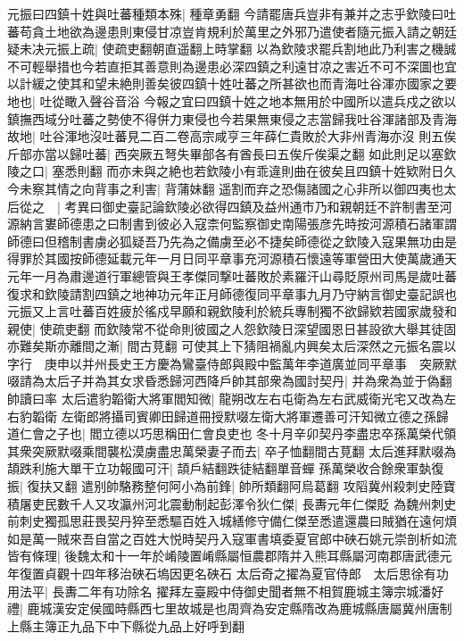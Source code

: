元振曰四鎮十姓與吐蕃種類本殊|{
	種章勇翻}
今請罷唐兵豈非有兼并之志乎欽陵曰吐蕃苟貪土地欲為邊患則東侵甘凉豈肯規利於萬里之外邪乃遣使者隨元振入請之朝廷疑未决元振上疏|{
	使疏吏翻朝直遥翻上時掌翻}
以為欽陵求罷兵割地此乃利害之機誠不可輕舉措也今若直拒其善意則為邊患必深四鎮之利遠甘凉之害近不可不深圖也宜以計緩之使其和望未絶則善矣彼四鎮十姓吐蕃之所甚欲也而青海吐谷渾亦國家之要地也|{
	吐從瞰入聲谷音浴}
今報之宜曰四鎮十姓之地本無用於中國所以遣兵戍之欲以鎮撫西域分吐蕃之勢使不得併力東侵也今若果無東侵之志當歸我吐谷渾諸部及青海故地|{
	吐谷渾地沒吐蕃見二百二卷高宗咸亨三年薛仁貴敗於大非州青海亦沒}
則五俟斤部亦當以歸吐蕃|{
	西突厥五弩失畢部各有酋長曰五俟斤俟渠之翻}
如此則足以塞欽陵之口|{
	塞悉則翻}
而亦未與之絶也若欽陵小有乖違則曲在彼矣且四鎮十姓欵附日久今未察其情之向背事之利害|{
	背蒲妹翻}
遥割而弃之恐傷諸國之心非所以御四夷也太后從之　|{
	考異曰御史臺記論欽陵必欲得四鎮及益州通市乃和親朝廷不許制書至河源納言婁師德患之曰制書到彼必入寇柰何監察御史南陽張彦先時按河源積石諸軍謂師德曰但稽制書虜必狐疑吾乃先為之備虜至必不捷矣師德從之欽陵入寇果無功由是得罪於其國按師德延載元年一月日同平章事充河源積石懷遠等軍營田大使萬歲通天元年一月為肅邊道行軍總管與王孝傑同撃吐蕃敗於素羅汗山尋貶原州司馬是歲吐蕃復求和欽陵請割四鎮之地神功元年正月師德復同平章事九月乃守納言御史臺記誤也}
元振又上言吐蕃百姓疲於徭戍早願和親欽陵利於統兵專制獨不欲歸欵若國家歲發和親使|{
	使疏吏翻}
而欽陵常不從命則彼國之人怨欽陵日深望國恩日甚設欲大舉其徒固亦難矣斯亦離間之漸|{
	間古莧翻}
可使其上下猜阻禍亂内興矣太后深然之元振名震以字行　庚申以并州長史王方慶為鸞臺侍郎與殿中監萬年李道廣並同平章事　突厥默啜請為太后子并為其女求昏悉歸河西降戶帥其部衆為國討契丹|{
	并為衆為並于偽翻帥讀曰率}
太后遣豹韜衛大將軍閻知微|{
	龍朔改左右屯衛為左右武威衛光宅又改為左右豹韜衛}
左衛郎將攝司賓卿田歸道冊授默啜左衛大將軍遷善可汗知微立德之孫歸道仁會之子也|{
	閻立德以巧思稱田仁會良吏也}
冬十月辛卯契丹李盡忠卒孫萬榮代領其衆突厥默啜乘間襲松漠虜盡忠萬榮妻子而去|{
	卒子恤翻間古莧翻}
太后進拜默啜為頡跌利施大單干立功報國可汗|{
	頡戶結翻跌徒結翻單音蟬}
孫萬榮收合餘衆軍埶復振|{
	復扶又翻}
遣别帥駱務整何阿小為前鋒|{
	帥所類翻阿烏葛翻}
攻䧟冀州殺刺史陸寶積屠吏民數千人又攻瀛州河北震動制起彭澤令狄仁傑|{
	長夀元年仁傑貶}
為魏州刺史前刺史獨孤思莊畏契丹猝至悉驅百姓入城繕修守備仁傑至悉遣還農曰賊猶在遠何煩如是萬一賊來吾自當之百姓大悦時契丹入寇軍書填委夏官郎中硤石姚元崇剖析如流皆有條理|{
	後魏太和十一年於崤陵置崤縣屬恒農郡隋并入熊耳縣屬河南郡唐武德元年復置貞觀十四年移治硤石塢因更名硤石}
太后奇之擢為夏官侍郎　太后思徐有功用法平|{
	長夀二年有功除名}
擢拜左臺殿中侍御史聞者無不相賀鹿城主簿宗城潘好禮|{
	鹿城漢安定侯國時縣西七里故城是也周齊為安定縣隋改為鹿城縣唐屬冀州唐制上縣主簿正九品下中下縣從九品上好呼到翻}
